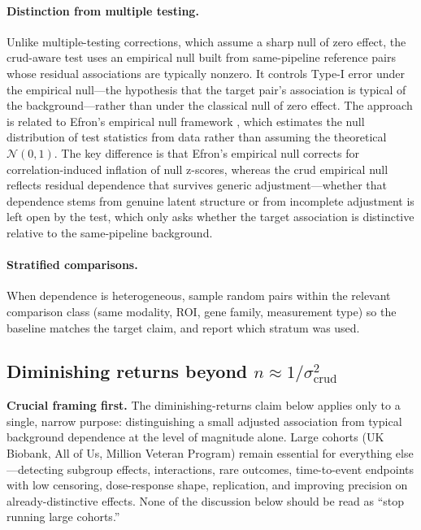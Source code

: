 \paragraph{Distinction from multiple testing.} Unlike multiple-testing corrections, which assume a sharp null of zero effect, the crud-aware test uses an empirical null built from same-pipeline reference pairs whose residual associations are typically nonzero. It controls Type-I error under the empirical null---the hypothesis that the target pair's association is typical of the background---rather than under the classical null of zero effect. The approach is related to Efron's empirical null framework \citep{efron2004}, which estimates the null distribution of test statistics from data rather than assuming the theoretical $\mathcal{N}(0,1)$. The key difference is that Efron's empirical null corrects for correlation-induced inflation of null z-scores, whereas the crud empirical null reflects residual dependence that survives generic adjustment---whether that dependence stems from genuine latent structure or from incomplete adjustment is left open by the test, which only asks whether the target association is distinctive relative to the same-pipeline background.

\paragraph{Stratified comparisons.} When dependence is heterogeneous, sample random pairs within the relevant comparison class (same modality, ROI, gene family, measurement type) so the baseline matches the target claim, and report which stratum was used.

\subsection{Diminishing returns beyond \texorpdfstring{$n \approx 1/\sigma_{\mathrm{crud}}^2$}{n approximately 1/sigma\_crud squared}}
\label{si:diminishing-returns}

\textbf{Crucial framing first.} The diminishing-returns claim below applies only to a single, narrow purpose: distinguishing a small adjusted association from typical background dependence at the level of magnitude alone. Large cohorts (UK Biobank, All of Us, Million Veteran Program) remain essential for everything else---detecting subgroup effects, interactions, rare outcomes, time-to-event endpoints with low censoring, dose-response shape, replication, and improving precision on already-distinctive effects. None of the discussion below should be read as ``stop running large cohorts.''

